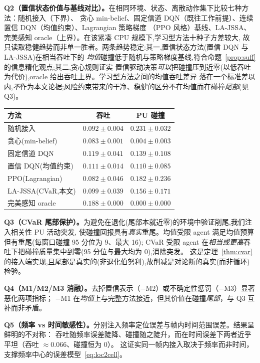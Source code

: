 \documentclass[11pt,a4paper]{article}
\newcommand{\hei}[1]{{\cjkhei #1}}
\theoremstyle{plain}
\theoremstyle{definition}
\begin{document}
\textbf{\hei{Q2（置信状态价值与基线对比）。}}在相同环境、状态、离散动作集下比较七种方法：随机接入（下界）、
贪心 min-belief、固定信道 DQN（既往工作前提）、连续置信 DQN（均值约束）、Lagrangian 策略梯度
（PPO 风格）基线、LA-JSSA、完美感知 oracle（上界）。在该紧凑 CPU 规模下,学习型方法十种子方差较大,
故只读取稳健趋势而非单一胜者。两条趋势稳定:其一,置信状态方法(置信 DQN 与 LA-JSSA)在相当吞吐下的
\emph{均值}碰撞低于随机与策略梯度基线,符合命题~\ref{prop:suff} 的信息精化观点;其二,贪心规则证实
置信驱动决策\emph{可以}把碰撞压到近零(以低吞吐为代价),oracle 给出吞吐上界。学习型方法之间的均值吞吐差异
落在一个标准差以内,\emph{不}作为本文论据;风险约束带来的干净、稳健的区分不在均值而在碰撞\emph{尾部}(见 Q3)。

\vspace{2pt}
\noindent\begin{tabular}{@{}lcc@{}}
\toprule
方法 & 吞吐 & PU 碰撞\\
\midrule
随机接入 & $0.092\pm0.004$ & $0.231\pm0.032$\\
贪心(min-belief) & $0.083\pm0.001$ & $0.004\pm0.003$\\
固定信道 DQN & $0.119\pm0.041$ & $0.139\pm0.108$\\
置信 DQN(均值约束) & $0.111\pm0.014$ & $0.110\pm0.085$\\
PPO(Lagrangian) & $0.082\pm0.046$ & $0.182\pm0.236$\\
LA-JSSA(CVaR,本文) & $0.099\pm0.039$ & $0.156\pm0.171$\\
完美感知 oracle & $0.188\pm0.000$ & $0.000\pm0.000$\\
\bottomrule
\end{tabular}
\vspace{2pt}

\textbf{\hei{Q3（CVaR 尾部保护）。}}为避免在退化(尾部本就近零)的环境中验证削尾,我们注入相关性 PU 活动突发,
使碰撞回报具有\emph{真实}重尾。均值受限 agent 满足均值预算但有重尾(每窗口碰撞 95 分位为 9、最大 16);
CVaR 受限 agent 在\emph{相当或更高}吞吐下把碰撞质量集中到零(95 分位与最大均为 0),消除突发。
这是定理~\ref{thm:cvar} 的接入端实现,且尾部是真实的(非退化伯努利),故削减是对论断的真实(而非循环)检验。

\textbf{\hei{Q4（M1/M2/M3 消融）。}}去掉置信表示（$-$M2）或不确定性惩罚（$-$M3）显著恶化两项指标；
$-$M1 在\emph{均值}上与完整方法接近，但其价值在碰撞\emph{尾部}，与 Q3 互补而非矛盾。

\textbf{\hei{Q5（频率 vs 时间敏感性）。}}分别注入频率定位误差与帧内时间范围误差。结果呈鲜明的不对称：
吞吐随频率误差陡降、碰撞随之陡升，而在时间误差下两者近乎平坦（吞吐 $\approx0.066$、碰撞恒为 $0$）。
这证实同一帧内接入取决于频率而非时间，支撑频率中心的误差模型~\eqref{eq:loc2cell}。
\end{document}
